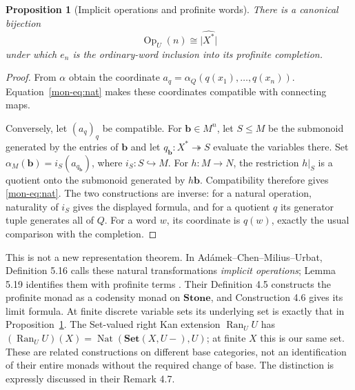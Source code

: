 \documentclass[11pt]{article}
\newtheorem{proposition}[theorem]{Proposition}
\theoremstyle{definition}
\theoremstyle{remark}
\newcommand{\Set}{\mathbf{Set}}
\newcommand{\Op}{\operatorname{Op}}
\newcommand{\Nat}{\operatorname{Nat}}
\begin{document}
\begin{proposition}[Implicit operations and profinite words]
\label{mon-prop:implicit}
There is a canonical bijection
\[
 \Op_U(n)\cong\bigl|\widehat{X^*}\bigr|
\]
under which $e_n$ is the ordinary-word inclusion into its profinite
completion.
\end{proposition}
\begin{proof}
From $\alpha$ obtain the coordinate
$a_q=\alpha_Q(q(x_1),\ldots,q(x_n))$. Equation~\eqref{mon-eq:nat} makes
these coordinates compatible with connecting maps.

Conversely, let $(a_q)_q$ be compatible. For $\mathbf b\in M^n$, let
$S\leq M$ be the submonoid generated by the entries of $\mathbf b$ and
let $q_{\mathbf b}:X^*\twoheadrightarrow S$ evaluate the variables there.
Set $\alpha_M(\mathbf b)=i_S(a_{q_{\mathbf b}})$, where $i_S:S\hookrightarrow M$.
For $h:M\to N$, the restriction $h|_S$ is a quotient onto the submonoid
generated by $h\mathbf b$. Compatibility therefore gives
\eqref{mon-eq:nat}. The two constructions are inverse: for a natural operation,
naturality of $i_S$ gives the displayed formula, and for a quotient $q$ its
generator tuple generates all of $Q$. For a word $w$, its coordinate is
$q(w)$, exactly the usual comparison with the completion.
\end{proof}

This is not a new representation theorem. In Ad\'amek--Chen--Milius--Urbat,
Definition 5.16 calls these natural transformations \emph{implicit
operations}; Lemma 5.19 identifies them with profinite terms
\cite{ACMU}. Their Definition 4.5 constructs the profinite monad as a
codensity monad on $\mathbf{Stone}$, and Construction 4.6 gives its limit
formula. At finite discrete variable sets its underlying set is exactly
that in Proposition~\ref{mon-prop:implicit}. The Set-valued right Kan extension
$\operatorname{Ran}_U U$ has
$(\operatorname{Ran}_U U)(X)=\Nat(\Set(X,U-),U)$; at finite $X$ this is
our same set. These are related constructions on different base categories,
not an identification of their entire monads without the required change
of base. The distinction is expressly discussed in their Remark 4.7.
\end{document}
